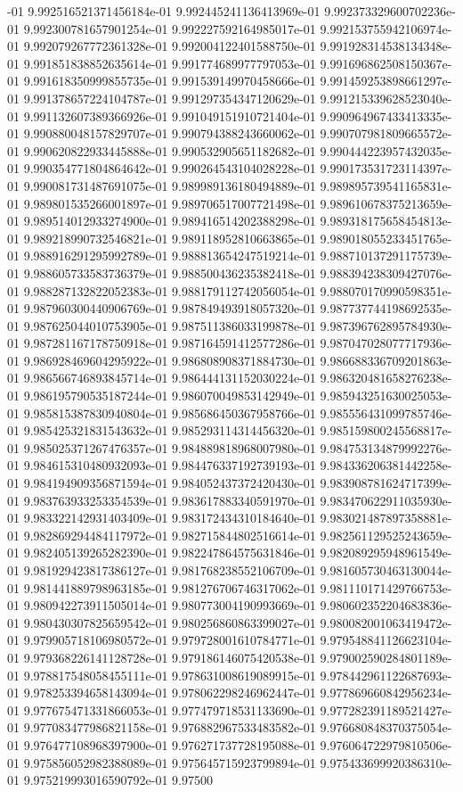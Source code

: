 -01	9.992516521371456184e-01	9.992445241136413969e-01	9.992373329600702236e-01	9.992300781657901254e-01	9.992227592164985017e-01	9.992153755942106974e-01	9.992079267772361328e-01	9.992004122401588750e-01	9.991928314538134348e-01	9.991851838852635614e-01	9.991774689977797053e-01	9.991696862508150367e-01	9.991618350999855735e-01	9.991539149970458666e-01	9.991459253898661297e-01	9.991378657224104787e-01	9.991297354347120629e-01	9.991215339628523040e-01	9.991132607389366926e-01	9.991049151910721404e-01	9.990964967433413335e-01	9.990880048157829707e-01	9.990794388243660062e-01	9.990707981809665572e-01	9.990620822933445888e-01	9.990532905651182682e-01	9.990444223957432035e-01	9.990354771804864642e-01	9.990264543104028228e-01	9.990173531723114397e-01	9.990081731487691075e-01	9.989989136180494889e-01	9.989895739541165831e-01	9.989801535266001897e-01	9.989706517007721498e-01	9.989610678375213659e-01	9.989514012933274900e-01	9.989416514202388298e-01	9.989318175658454813e-01	9.989218990732546821e-01	9.989118952810663865e-01	9.989018055233451765e-01	9.988916291295992789e-01	9.988813654247519214e-01	9.988710137291175739e-01	9.988605733583736379e-01	9.988500436235382418e-01	9.988394238309427076e-01	9.988287132822052383e-01	9.988179112742056054e-01	9.988070170990598351e-01	9.987960300440906769e-01	9.987849493918057320e-01	9.987737744198692535e-01	9.987625044010753905e-01	9.987511386033199878e-01	9.987396762895784930e-01	9.987281167178750918e-01	9.987164591412577286e-01	9.987047028077717936e-01	9.986928469604295922e-01	9.986808908371884730e-01	9.986688336709201863e-01	9.986566746893845714e-01	9.986444131152030224e-01	9.986320481658276238e-01	9.986195790535187244e-01	9.986070049853142949e-01	9.985943251630025053e-01	9.985815387830940804e-01	9.985686450367958766e-01	9.985556431099785746e-01	9.985425321831543632e-01	9.985293114314456320e-01	9.985159800245568817e-01	9.985025371267476357e-01	9.984889818968007980e-01	9.984753134879992276e-01	9.984615310480932093e-01	9.984476337192739193e-01	9.984336206381442258e-01	9.984194909356871594e-01	9.984052437372420430e-01	9.983908781624717399e-01	9.983763933253354539e-01	9.983617883340591970e-01	9.983470622911035930e-01	9.983322142931403409e-01	9.983172434310184640e-01	9.983021487897358881e-01	9.982869294484117972e-01	9.982715844802516614e-01	9.982561129525243659e-01	9.982405139265282390e-01	9.982247864575631846e-01	9.982089295948961549e-01	9.981929423817386127e-01	9.981768238552106709e-01	9.981605730463130044e-01	9.981441889798963185e-01	9.981276706746317062e-01	9.981110171429766753e-01	9.980942273911505014e-01	9.980773004190993669e-01	9.980602352204683836e-01	9.980430307825659542e-01	9.980256860863399027e-01	9.980082001063419472e-01	9.979905718106980572e-01	9.979728001610784771e-01	9.979548841126623104e-01	9.979368226141128728e-01	9.979186146075420538e-01	9.979002590284801189e-01	9.978817548058455111e-01	9.978631008619089915e-01	9.978442961122687693e-01	9.978253394658143094e-01	9.978062298246962447e-01	9.977869660842956234e-01	9.977675471331866053e-01	9.977479718531133690e-01	9.977282391189521427e-01	9.977083477986821158e-01	9.976882967533483582e-01	9.976680848370375054e-01	9.976477108968397900e-01	9.976271737728195088e-01	9.976064722979810506e-01	9.975856052982388089e-01	9.975645715923799894e-01	9.975433699920386310e-01	9.975219993016590792e-01	9.97500